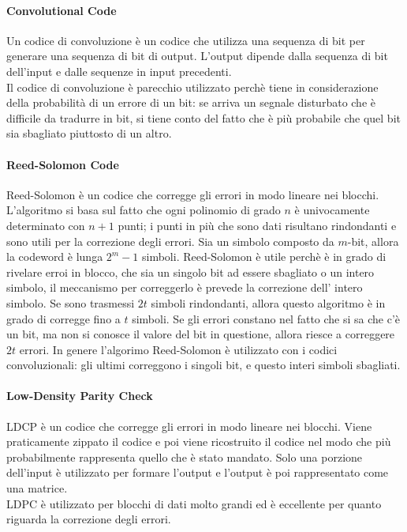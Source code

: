 \documentclass{article}
\begin{document}
\paragraph{Convolutional Code}
Un codice di convoluzione è un codice che utilizza una sequenza di bit per
generare una sequenza di bit di output. L'output dipende dalla sequenza di bit
dell'input e dalle sequenze in input precedenti.\\
Il codice di convoluzione è parecchio utilizzato perchè tiene in considerazione
della probabilità di un errore di un bit: se arriva un segnale disturbato che è
difficile da tradurre in bit, si tiene conto del fatto che è più probabile che
quel bit sia sbagliato piuttosto di un altro.

\paragraph{Reed-Solomon Code}
Reed-Solomon è un codice che corregge gli errori in modo lineare nei blocchi.
L'algoritmo si basa sul fatto che ogni polinomio di grado $n$ è univocamente
determinato con $n+1$ punti; i punti in più che sono dati risultano rindondanti
e sono utili per la correzione degli errori. Sia un simbolo composto da $m$-bit,
allora la codeword è lunga $2^m-1$ simboli. Reed-Solomon è utile perchè è in
grado di rivelare erroi in blocco, che sia un singolo bit ad essere sbagliato o
un intero simbolo, il meccanismo per correggerlo è prevede la correzione dell'
intero simbolo. Se sono trasmessi $2t$ simboli rindondanti, allora questo
algoritmo è in grado di corregge fino a $t$ simboli. Se gli errori constano nel
fatto che si sa che c'è un bit, ma non si conosce il valore del bit in questione,
allora riesce a correggere $2t$ errori. In genere l'algorimo Reed-Solomon è
utilizzato con i codici convoluzionali: gli ultimi correggono i singoli bit, e
questo interi simboli sbagliati.

\paragraph{Low-Density Parity Check} LDCP è un codice che corregge gli errori in
modo lineare nei blocchi. Viene praticamente zippato il codice e poi viene
ricostruito il codice nel modo che più probabilmente rappresenta quello che è
stato mandato. Solo una porzione dell'input è utilizzato per formare l'output e
l'output è poi rappresentato come una matrice.\\
LDPC è utilizzato per blocchi di dati molto grandi ed è eccellente per quanto
riguarda la correzione degli errori.
\end{document}
